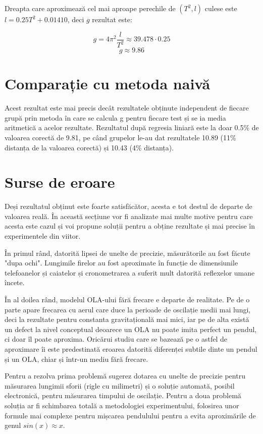 \documentclass{article}
\begin{document}
Dreapta care aproximează cel mai aproape perechile de $(T^2, l)$ culese
este $l = 0.25 T^2 + 0.01410$, deci $g$ rezultat este:

\begin{center}
	\[ g = 4\pi^2\frac{l}{T^2} \approx 39.478\cdot0.25 \]
	\[ g \approx 9.86 \]
\end{center}

\section{Comparație cu metoda naivă}

Acest rezultat este mai precis decât rezultatele obținute independent de
fiecare grupă prin metoda în care se calcula g pentru fiecare test și se ia
media aritmetică a acelor rezultate. Rezultatul după regresia liniară este la
doar 0.5\% de valoarea corectă de 9.81, pe când grupelor le-au dat rezultatele 10.89 (11\% distanța de la valoarea corectă) și 10.43 (4\% distanța).

\section{Surse de eroare}

Deși rezultatul obținut este foarte satisfăcător, acesta e tot destul de departe
de valoarea reală. În această secțiune vor fi analizate mai multe motive pentru
care acesta este cazul și voi propune soluții pentru a obține rezultate și mai
precise în experimentele din viitor.

În primul rând, datorită lipsei de unelte de precizie, măsurătorile au fost făcute
"dupa ochi". Lungimile firelor au fost aproximate în funcție de dimensiunile telefoanelor
și caiatelor și cronometrarea a suferit mult datorită reflexelor umane încete.

În al doilea rând, modelul OLA-ului fără frecare e departe de realitate. Pe de o parte
apare frecarea cu aerul care duce la perioade de oscilație medii mai lungi, deci la
rezultate pentru constanta gravitațională mai mici, iar pe de alta există un defect
la nivel conceptual deoarece un OLA nu poate imita perfect un pendul, ci doar îl poate
aproxima. Oricărui studiu care se bazează pe o astfel de aproximare îi este predestinată
eroarea datorită diferenței subtile dinte un pendul și un OLA, chiar și într-un mediu fără frecare.

Pentru a rezolva prima problemă sugerez dotarea cu unelte de precizie pentru măsurarea
lungimii sforii (rigle cu milimetri) și o soluție automată, posibil electronică, pentru măsurarea
timpului de oscilație. Pentru a doua problemă soluția ar fi schimbarea totală a metodologiei
experimentului, folosirea unor formule mai complexe pentru mișcarea pendulului pentru a evita
aproximările de genul $sin(x) \approx x$.
\end{document}
